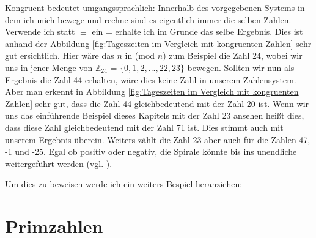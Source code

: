 \documentclass[german,12pt,a4paper]{article}
\begin{document}
Kongruent bedeutet umgangssprachlich: Innerhalb des vorgegebenen Systems in dem ich mich bewege und rechne sind es eigentlich immer die selben Zahlen. Verwende ich statt $\equiv$ ein = erhalte ich im Grunde das selbe Ergebnis. Dies ist anhand der Abbildung \ref{fig:Tageszeiten im Vergleich mit kongruenten Zahlen} sehr gut ersichtlich. Hier wäre das $n$ in (mod $n$) zum Beispiel die Zahl 24, wobei wir uns in jener Menge von $\mathbb{Z}_{24}$ = $\{0, 1, 2, ..., 22, 23\}$ bewegen. Sollten wir nun als Ergebnis die Zahl 44 erhalten, wäre dies keine Zahl in unserem Zahlensystem. Aber man erkennt in Abbildung \ref{fig:Tageszeiten im Vergleich mit kongruenten Zahlen} sehr gut, dass die Zahl 44 gleichbedeutend mit der Zahl 20 ist. Wenn wir uns das einführende Beispiel dieses Kapitels mit der Zahl 23 ansehen heißt dies, dass diese Zahl gleichbedeutend mit der Zahl 71 ist. Dies stimmt auch mit unserem Ergebnis überein. Weiters zählt die Zahl 23 aber auch für die Zahlen 47, -1 und -25. Egal ob positiv oder negativ, die Spirale könnte bis ins unendliche weitergeführt werden (vgl. \cite[298--299]{Meinel2011}).

Um dies zu beweisen werde ich ein weiters Bespiel heranziehen:



\section{Primzahlen}
\end{document}
